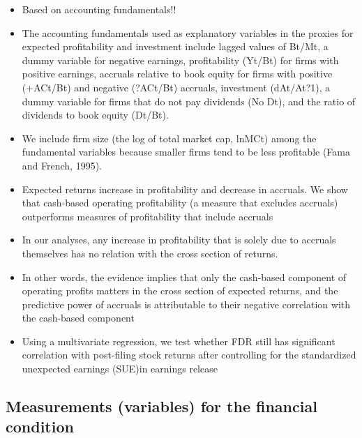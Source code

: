 \documentclass[12pt]{article}
\begin{document}
    \begin{itemize}

        \item Based on accounting fundamentals!! 

        \item The accounting fundamentals used as explanatory variables in the proxies for expected profitability and investment include lagged values of Bt/Mt, a dummy variable for negative earnings, profitability (Yt/Bt) for firms with positive earnings, accruals relative to book
        equity for firms with positive (+ACt/Bt) and negative (?ACt/Bt) accruals, investment (dAt/At?1), a dummy variable for firms that do not pay dividends (No Dt), and the ratio of dividends to book equity (Dt/Bt).\citep{Fama2006}

        \item We include firm size (the log of total market cap, lnMCt) among the fundamental variables because smaller firms tend to be less profitable (Fama and French, 1995).\citep{Fama2006}

        \item Expected returns increase in profitability and decrease in accruals. We show that cash-based operating profitability (a measure that excludes accruals) outperforms measures of profitability that include accruals \citep{Ball2016}

        \item In our analyses, any increase in profitability that is solely due to accruals themselves has no relation with the cross section of returns.\citep{Ball2016}

        \item In other words, the evidence implies that only the cash-based component of operating profits matters in the cross section of expected returns, and the predictive power of accruals is attributable to their negative correlation with the cash-based component \citep{Ball2016}
       
        \item Using a multivariate regression, we test whether FDR still has significant correlation with post-filing stock returns after controlling for the standardized unexpected earnings (SUE)in earnings release \citep{You2009}

    \end{itemize}

    
\subsection{Measurements (variables) for the financial condition} 
    
\end{document}
